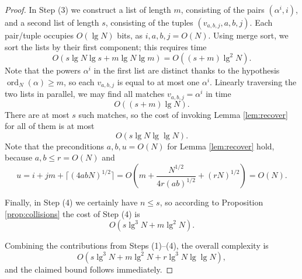 \documentclass[reqno]{amsart}
\theoremstyle{remark}
\numberwithin{equation}{section}
\numberwithin{thm}{section}
\renewcommand{\leq}{\leqslant}
\renewcommand{\geq}{\geqslant}
\DeclareMathOperator{\ord}{ord}
\begin{document}
\begin{proof}
  In Step (3) we construct a list of length $m$,
  consisting of the pairs $(\alpha^i, i)$,
  and a second list of length $s$, consisting of the tuples $(v_{a,b,j},a,b,j)$.
  Each pair/tuple occupies $O(\lg N)$ bits, as $i, a, b, j = O(N)$.
  Using merge sort, we sort the lists by their first component;
  this requires time
    \[ O(s \lg N \lg s + m \lg N \lg m) = O((s + m) \lg^2 N). \]
  Note that the powers $\alpha^i$ in the first list are distinct thanks
  to the hypothesis $\ord_N(\alpha) \geq m$,
  so each $v_{a,b,j}$ is equal to at most one $\alpha^i$.
  Linearly traversing the two lists in parallel,
  we may find all matches $v_{a,b,j} = \alpha^i$ in time
    \[ O((s + m) \lg N). \]
  There are at most $s$ such matches,
  so the cost of invoking Lemma \ref{lem:recover} for all of them is at most
    \[ O(s \lg N \lg \lg N). \]
  Note that the preconditions $a, b, u = O(N)$ for Lemma \ref{lem:recover} hold,
  because $a, b \leq r = O(N)$ and
    \[ u = i + jm + \lceil (4abN)^{1/2} \rceil
         = O\left(m + \frac{N^{1/2}}{4r(ab)^{1/2}} + (rN)^{1/2} \right)
         = O(N). \]

  Finally, in Step (4) we certainly have $n \leq s$,
  so according to Proposition \ref{prop:collisions} the cost of Step (4) is
    \[ O(s \lg^3 N + m \lg^2 N). \]

  Combining the contributions from Steps (1)--(4), the overall complexity is
    \[ O(s \lg^3 N + m \lg^2 N + r \lg^3 N \lg \lg N), \]
  and the claimed bound follows immediately.
\end{proof}
\end{document}
